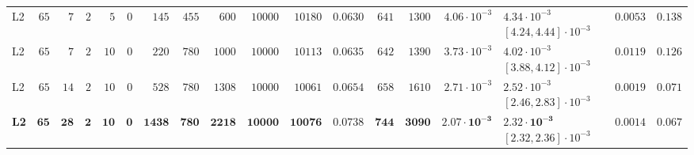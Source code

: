 \begin{table}[!htbp]
{\begin{tabular}{@{}lrrrrrrrrrrrrrrlrr@{}}
L2 & $65$ & $7$ & $2$ & $5$ & $0$ & $145$ & $455$ & $600$ & $10000$ & $10180$ & $0.0630$ & $641$ & $1300$ & $4.06\cdot 10^{-3}$ & $4.34\cdot 10^{-3}$ $[4.24, 4.44]\cdot 10^{-3}$ & $0.0053$ & $0.138$ \\
L2 & $65$ & $7$ & $2$ & $10$ & $0$ & $220$ & $780$ & $1000$ & $10000$ & $10113$ & $0.0635$ & $642$ & $1390$ & $3.73\cdot 10^{-3}$ & $4.02\cdot 10^{-3}$ $[3.88, 4.12]\cdot 10^{-3}$ & $0.0119$ & $0.126$ \\
L2 & $65$ & $14$ & $2$ & $10$ & $0$ & $528$ & $780$ & $1308$ & $10000$ & $10061$ & $0.0654$ & $658$ & $1610$ & $2.71\cdot 10^{-3}$ & $2.52\cdot 10^{-3}$ $[2.46, 2.83]\cdot 10^{-3}$ & $0.0019$ & $0.071$ \\
\textbf{L2} & $\mathbf{65}$ & $\mathbf{28}$ & $\mathbf{2}$ & $\mathbf{10}$ & $\mathbf{0}$ & $\mathbf{1438}$ & $\mathbf{780}$ & $\mathbf{2218}$ & $\mathbf{10000}$ & $\mathbf{10076}$ & $\mathbf{0.0738}$ & $\mathbf{744}$ & $\mathbf{3090}$ & $\mathbf{2.07\cdot 10^{-3}}$ & $\mathbf{2.32\cdot 10^{-3}}$ $[2.32, 2.36]\cdot 10^{-3}$ & $\mathbf{0.0014}$ & $\mathbf{0.067}$ \\
\bottomrule
\end{tabular}
}
\end{table}

